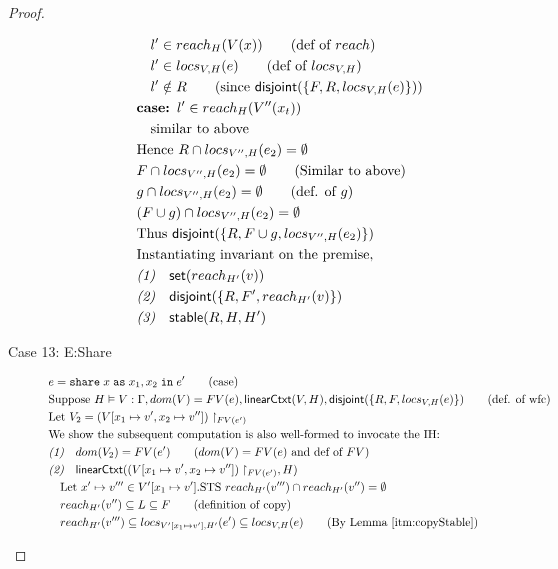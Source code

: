 \documentclass{easychair}
\newcommand{\ms}[1]{\ensuremath{\mathsf{#1}}}
\newcommand{\irl}[1]{\mathtt{#1}}
\newcommand{\na}[1]{\mathsf{linearCtxt}(#1)}
\newcommand{\stable}[1]{\mathsf{stable}(#1)}
\newcommand{\dist}[1]{\mathsf{disjoint}(#1)}
\newcommand{\sharecpcst}[4]{\irl{share}\;#1\;\irl{as}\;#2,#3\;\irl{in}\;#4}
\theoremstyle{definition}
\begin{document}
\begin{proof}
\begin{description}
\begin{align*}
  &\quad l' \in reach_{H}(V(x)) \tag{def of $reach$}\\
  &\quad l' \in locs_{V,H}(e) \tag{def of $locs_{V,H}$}\\
  &\quad l' \notin R \tag{since $\dist{\{F,R,locs_{V,H}(e)\}}$}\\
  &\textbf{case: }  l' \in reach_{H}(V''(x_t)) \\
  &\quad \text{similar to above}\\
  &\text{Hence } R \cap locs_{V'',H}(e_2) = \emptyset\\
  &F \cap locs_{V'',H}(e_2) = \emptyset \tag{Similar to above}\\
  &g \cap locs_{V'',H}(e_2) = \emptyset \tag{def. of $g$}\\
  &(F \cup g) \cap locs_{V'',H}(e_2) = \emptyset\\
  &\text{Thus } \dist{\{R,F \cup g,locs_{V'',H}(e_2)\}}\\
  &\text{Instantiating invariant on the premise} ,\\
  &\emph{(1)} \quad \ms{set}(reach_{H'}(v))\\
  &\emph{(2)} \quad\dist{\{R,F',reach_{H'}(v)\}}\\
  &\emph{(3)} \quad\stable{R,H,H'}\\
  \end{align*}
	\item [Case 13: E:Share]
  \begin{align*}
  &e = \sharecpcst{x}{x_1}{x_2}{e'} \tag{case}\\
  &\text{Suppose } H \vDash V : \Gamma, dom(V) = FV(e), \na{V,H}, \dist{\{R,F,locs_{V,H}(e)\}} 
		\tag{def. of wfc} \\
		&\text{Let } V_2 = (V[x_1 \mapsto v', x_2 \mapsto v''])\restriction_{FV(e')}\\
	&\text{We show the subsequent computation is also well-formed to invocate the IH:}\\
  &\emph{(1)} \quad dom(V_2) = FV(e') \tag{$dom(V) = FV(e)$ and def of $FV$}\\
		&\emph{(2)} \quad \na{(V[x_1 \mapsto v', x_2 \mapsto v''])\restriction_{FV(e')},H}\\
  &\quad \text{Let } x' \mapsto v''' \in V'[x_1 \mapsto v']. 
		\text{STS } reach_{H'}(v''') \cap reach_{H'}(v'') = \emptyset\\
	&\quad reach_{H'}(v'') \subseteq L \subseteq F \tag{definition of copy}\\
	&\quad reach_{H'}(v''') \subseteq locs_{V'[x_1\mapsto v'],H'}(e') \subseteq locs_{V,H}(e) 
		\tag{By Lemma~\ref{itm:copyStable}}\\ 

\end{align*}
\end{description}
\end{proof}
\end{document}
